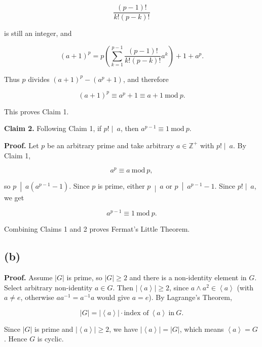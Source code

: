 \[\frac{\left( {p - 1} \right)!}{k!\left( {p - k} \right)!}\]

is still an integer, and

\[\left( {a + 1} \right)^{p} = p\left( {\sum\limits_{k = 1}^{p - 1}\frac{\left( {p - 1} \right)!}{k!\left( {p - k} \right)!}a^{k}} \right) + 1 + a^{p}.\]

Thus \(p\) divides \(\left( {a + 1} \right)^{p} - \left( {a^{p} + 1} \right)\), and therefore

\[\left( {a + 1} \right)^{p} \equiv a^{p} + 1 \equiv a + 1\ \text{mod}\ p.\]

This proves Claim 1.

\textbf{Claim 2.} Following Claim 1, if \(\left. p! \middle| \ a \right.\), then \(a^{p - 1} \equiv 1\ \text{mod}\ p\).

\textbf{Proof.} Let \(p\) be an arbitrary prime and take arbitrary \(a \in \mathbb{Z}^{+}\) with \(\left. p! \middle| \ a \right.\). By Claim 1,

\[a^{p} \equiv a\ \text{mod}\ p,\]

so \(\left. p\  \middle| \ a\left( {a^{p - 1} - 1} \right) \right.\). Since \(p\) is prime, either \(\left. p\  \middle| \ a \right.\) or \(\left. p\  \middle| \ a^{p - 1} - 1 \right.\). Since \(\left. p! \middle| \ a \right.\), we get

\[a^{p - 1} \equiv 1\ \text{mod}\ p.\]

Combining Claims 1 and 2 proves Fermat's Little Theorem.

\subsection{(b)}

\textbf{Proof.} Assume \(|G|\) is prime, so \(|G| \geq 2\) and there is a non-identity element in \(G\). Select arbitrary non-identity \(a \in G\). Then \(\left| \left\langle a \right\rangle \right| \geq 2\), since \(a \land a^{2} \in \left\langle a \right\rangle\) (with \(a \neq e\), otherwise \(aa^{- 1} = a^{- 1}a\) would give \(a = e\)). By Lagrange's Theorem,

\[|G| = \left| \left\langle a \right\rangle \right| \cdot \text{index of}\ \left\langle a \right\rangle\ \text{in}\ G.\]

Since \(|G|\) is prime and \(\left| \left\langle a \right\rangle \right| \geq 2\), we have \(\left| \left\langle a \right\rangle \right| = |G|\), which means \(\left\langle a \right\rangle = G\). Hence \(G\) is cyclic.

